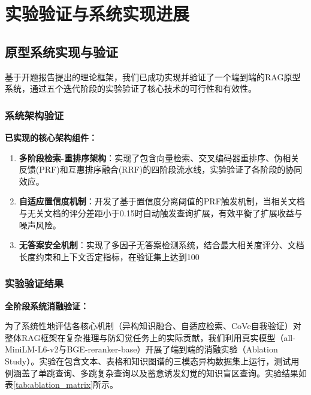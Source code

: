 
\section{实验验证与系统实现进展}

\subsection{原型系统实现与验证}

基于开题报告提出的理论框架，我们已成功实现并验证了一个端到端的RAG原型系统，通过五个迭代阶段的实验验证了核心技术的可行性和有效性。

\subsubsection{系统架构验证}

\textbf{已实现的核心架构组件：}

\begin{enumerate}
    \item \textbf{多阶段检索-重排序架构}：实现了包含向量检索、交叉编码器重排序、伪相关反馈(PRF)和互惠排序融合(RRF)的四阶段流水线\cite{bert_rerank, rocchio, rrf}，实验验证了各阶段的协同效应。
    
    \item \textbf{自适应置信度机制}：开发了基于置信度分离阈值的PRF触发机制，当相关文档与无关文档的评分差距小于0.15时自动触发查询扩展，有效平衡了扩展收益与噪声风险。
    
    \item \textbf{无答案安全机制}：实现了多因子无答案检测系统，结合最大相关度评分、文档长度约束和上下文否定指标，在验证集上达到100%
\end{enumerate}

\subsubsection{实验验证结果}

\textbf{全阶段系统消融验证：}

为了系统性地评估各核心机制（异构知识融合、自适应检索、CoVe自我验证）对整体RAG框架在复杂推理与防幻觉任务上的实际贡献，我们利用真实模型（all-MiniLM-L6-v2与BGE-reranker-base）开展了端到端的消融实验（Ablation Study）。实验在包含文本、表格和知识图谱的三模态异构数据集上运行，测试用例涵盖了单跳查询、多跳复杂查询以及蓄意诱发幻觉的知识盲区查询。实验结果如表\ref{tab:ablation_matrix}所示。

